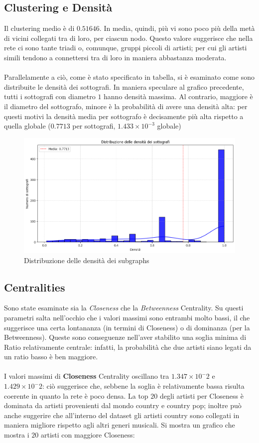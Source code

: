 \documentclass[sigchi]{acmart}
\begin{document}
\subsection{Clustering e Densità}

Il clustering medio è di $0.51646$. In media, quindi, più vi sono poco più della metà di vicini collegati tra di loro, per ciascun nodo. Questo valore suggerisce che nella rete ci sono tante triadi o, comunque, gruppi piccoli di artisti; per cui gli artisti simili tendono a connettersi tra di loro in maniera abbastanza moderata. \\ \\ Parallelamente a ciò, come è stato specificato in tabella, si è esaminato come sono distribuite le densità dei sottografi. In maniera speculare al grafico precedente, tutti i sottografi con diametro $1$ hanno densità massima. Al contrario, maggiore è il diametro del sottografo, minore è la probabilità di avere una densità alta: per questi motivi la densità media per sottografo è decisamente più alta rispetto a quella globale ($0.7713$ per sottografi, $1.433 \times 10^{-3}$ globale)

\begin{figure}[H]
\centering
\includegraphics[width=0.45
\textwidth]{../network_analysis/plots/2_6/densDist.png}
\caption{Distribuzione delle densità dei subgraphs}
\label{fig:densDist}
\end{figure}


\subsection{Centralities}

Sono state esaminate sia la {\itshape Closeness} che la {\itshape Betweenness} Centrality. Su questi parametri salta nell'occhio che i valori massimi sono entrambi molto bassi, il che suggerisce una certa lontananza (in termini di Closeness) o di dominanza (per la Betweenness). Queste sono conseguenze nell'aver stabilito una soglia minima di Ratio relativamente centrale: infatti, la probabilità che due artisti siano legati da un ratio basso è ben maggiore. \\ \\ I valori massimi di {\bfseries Closeness} Centrality oscillano tra $1.347 \times 10^-2$ e $1.429 \times 10^-2$: ciò suggerisce che, sebbene la soglia è relativamente bassa risulta coerente in quanto la rete è poco densa. La top $20$ degli artisti per Closeness è dominata da artisti provenienti dal mondo country e country pop; inoltre può anche suggerire che all'interno del dataset gli artisti country sono collegati in maniera migliore rispetto agli altri generi musicali. Si mostra un grafico che mostra i $20$ artisti con maggiore Closeness:
\end{document}
